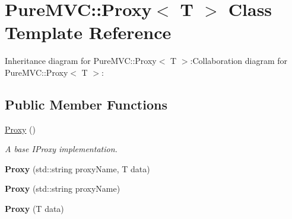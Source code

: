 \hypertarget{class_pure_m_v_c_1_1_proxy}{
\section{PureMVC::Proxy$<$ T $>$ Class Template Reference}
\label{class_pure_m_v_c_1_1_proxy}
}
Inheritance diagram for PureMVC::Proxy$<$ T $>$:Collaboration diagram for PureMVC::Proxy$<$ T $>$:\subsection*{Public Member Functions}
\begin{DoxyCompactItemize}
\item 
\hyperlink{class_pure_m_v_c_1_1_proxy_ab9b9198b6a4aeec5fa06f8a73c1d96f8}{Proxy} ()
\begin{DoxyCompactList}\small\item\em A base {\ttfamily IProxy} implementation. \item\end{DoxyCompactList}\item 
\hypertarget{class_pure_m_v_c_1_1_proxy_a4842dcd3159302e97d318067c32c58bc}{
{\bfseries Proxy} (std::string proxyName, T data)}
\label{class_pure_m_v_c_1_1_proxy_a4842dcd3159302e97d318067c32c58bc}

\item 
\hypertarget{class_pure_m_v_c_1_1_proxy_a66b3b9152f8bb7e35d4b243200a8a0aa}{
{\bfseries Proxy} (std::string proxyName)}
\label{class_pure_m_v_c_1_1_proxy_a66b3b9152f8bb7e35d4b243200a8a0aa}

\item 
\hypertarget{class_pure_m_v_c_1_1_proxy_a568ac6e7061f879725fbc193f1f9a7ef}{
{\bfseries Proxy} (T data)}
\label{class_pure_m_v_c_1_1_proxy_a568ac6e7061f879725fbc193f1f9a7ef}


\end{DoxyCompactItemize}
